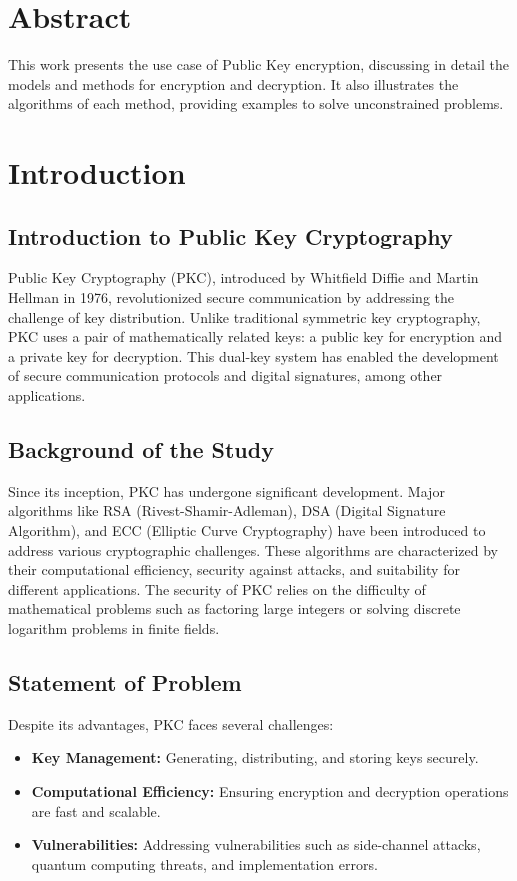 \documentclass[12pt]{article}
\begin{document}
\newpage

\section*{Abstract}
This work presents the use case of Public Key encryption, discussing in detail the models and methods for encryption and decryption. It also illustrates the algorithms of each method, providing examples to solve unconstrained problems.

\newpage

\tableofcontents
\newpage

\section{Introduction}

\subsection{Introduction to Public Key Cryptography}
Public Key Cryptography (PKC), introduced by Whitfield Diffie and Martin Hellman in 1976, revolutionized secure communication by addressing the challenge of key distribution. Unlike traditional symmetric key cryptography, PKC uses a pair of mathematically related keys: a public key for encryption and a private key for decryption. This dual-key system has enabled the development of secure communication protocols and digital signatures, among other applications.

\subsection{Background of the Study}
Since its inception, PKC has undergone significant development. Major algorithms like RSA (Rivest-Shamir-Adleman), DSA (Digital Signature Algorithm), and ECC (Elliptic Curve Cryptography) have been introduced to address various cryptographic challenges. These algorithms are characterized by their computational efficiency, security against attacks, and suitability for different applications. The security of PKC relies on the difficulty of mathematical problems such as factoring large integers or solving discrete logarithm problems in finite fields.

\subsection{Statement of Problem}
Despite its advantages, PKC faces several challenges:
\begin{itemize}
    \item \textbf{Key Management:} Generating, distributing, and storing keys securely.
    \item \textbf{Computational Efficiency:} Ensuring encryption and decryption operations are fast and scalable.
    \item \textbf{Vulnerabilities:} Addressing vulnerabilities such as side-channel attacks, quantum computing threats, and implementation errors.
\end{itemize}
\end{document}
